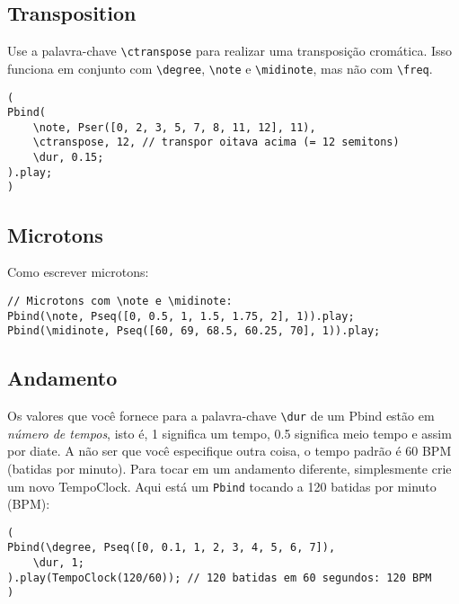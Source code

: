 \subsection{Transposition}

Use a palavra-chave \texttt{\textbackslash ctranspose} para realizar uma transposição cromática. Isso funciona em conjunto com \texttt{\textbackslash degree}, \texttt{\textbackslash note} e \texttt{\textbackslash midinote}, mas não com \texttt{\textbackslash freq}.

\begin{lstlisting}[style=SuperCollider-IDE, basicstyle=\scttfamily\footnotesize]
(
Pbind(
	\note, Pser([0, 2, 3, 5, 7, 8, 11, 12], 11),
	\ctranspose, 12, // transpor oitava acima (= 12 semitons)
	\dur, 0.15;
).play;
)
\end{lstlisting}

\subsection{Microtons}
 
Como escrever microtons:

\begin{lstlisting}[style=SuperCollider-IDE, basicstyle=\scttfamily\footnotesize]
// Microtons com \note e \midinote:
Pbind(\note, Pseq([0, 0.5, 1, 1.5, 1.75, 2], 1)).play;
Pbind(\midinote, Pseq([60, 69, 68.5, 60.25, 70], 1)).play;
\end{lstlisting}
 
\subsection{Andamento}

Os valores que você fornece para a palavra-chave \texttt{\textbackslash dur} de um Pbind estão em \emph{número de tempos}, isto é, 1 significa um tempo, 0.5 significa meio tempo e assim por diate. A não ser que você especifique outra coisa, o tempo padrão é 60 BPM (batidas por minuto). Para tocar em um andamento diferente, simplesmente crie um novo TempoClock. Aqui está um  \texttt{Pbind} tocando a 120 batidas por minuto (BPM):
 
\begin{lstlisting}[style=SuperCollider-IDE, basicstyle=\scttfamily\footnotesize]
(
Pbind(\degree, Pseq([0, 0.1, 1, 2, 3, 4, 5, 6, 7]),
	\dur, 1;
).play(TempoClock(120/60)); // 120 batidas em 60 segundos: 120 BPM
)
\end{lstlisting}
 
